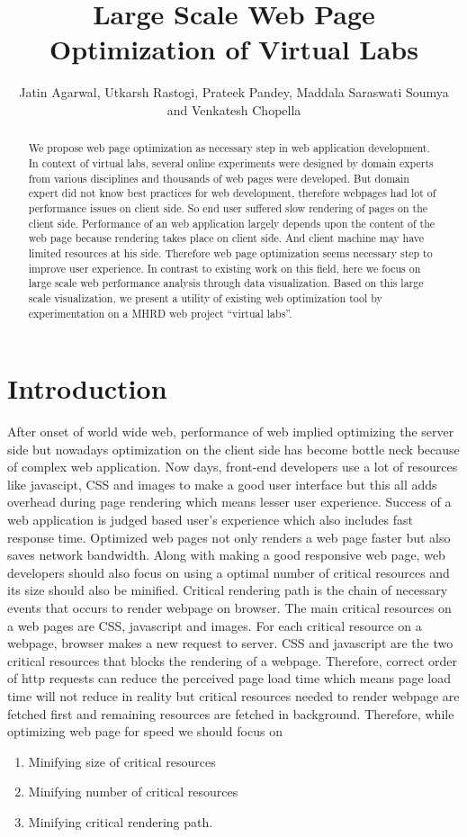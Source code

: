 \documentclass[conference]{IEEEtran}
\title{Large Scale Web Page Optimization of Virtual Labs}
\author{Jatin Agarwal, Utkarsh Rastogi, Prateek Pandey, Maddala Saraswati Soumya and Venkatesh Chopella}
\begin{document}
\maketitle

\begin{abstract}
We propose web page optimization as necessary step in web application
development. In context of virtual labs, several online experiments were designed by domain
experts from various disciplines and thousands of web pages were developed.
But domain expert did not know best practices for web development, therefore
webpages had lot of performance issues on client side. So end user suffered slow
rendering of pages on the client side.
Performance of an web application largely depends upon the content of the web
page because rendering takes place on client side. 
And client machine may have limited resources at his side. Therefore web page
optimization seems necessary step to improve user experience.
In contrast to existing work on this field, here we focus on large scale web
performance analysis through data visualization. Based on this large scale visualization,
we present a utility of existing web optimization tool by experimentation on a
MHRD web project ``virtual labs''.
\end{abstract}

\section{Introduction}\label{sec-2}
After onset of world wide web, performance of web implied optimizing the server side but nowadays
optimization on the client side has become bottle neck because of complex web
application. Now days, front-end developers use a lot of resources like
javascipt, CSS and images to make a good user interface but this all adds
overhead during page rendering which means lesser user experience. Success of a web
application is judged based user's experience which also includes fast response
time. Optimized web pages not only renders a web page faster but also saves network
bandwidth. Along with making a good responsive web page, web developers should
also focus on using a optimal number of critical resources and its size should
also be minified. Critical rendering path is the chain of necessary events that
occurs to render webpage on browser. The main critical resources on a web
pages are CSS, javascript and images. For each critical resource on a
webpage, browser makes a new request to server. CSS and javascript are the two
critical resources that blocks the rendering of a webpage. Therefore, correct
order of http requests can reduce the perceived page load time which means page
load time will not reduce in reality but critical resources needed to render webpage are
fetched first and remaining resources are fetched in background. Therefore,
while optimizing web page for speed we should focus on 
\begin{enumerate}
 \item Minifying size of critical resources
 \item Minifying number of critical resources
 \item Minifying critical rendering path.
\end{enumerate}
\end{document}
